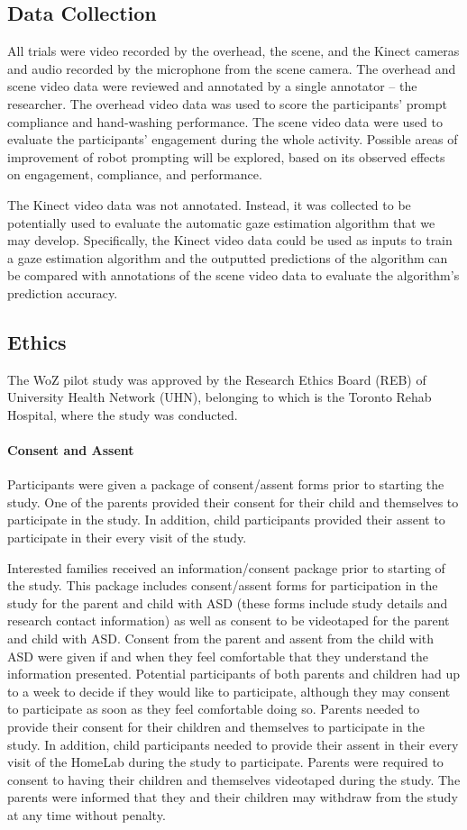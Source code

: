 \documentclass{ut-thesis}
\begin{document}
\subsection{Data Collection}
All trials were video recorded by the overhead, the scene, and the Kinect cameras and audio recorded by the microphone from the scene camera.  The overhead and scene video data were reviewed and annotated by a single annotator -- the researcher. The overhead video data was used to score the participants' prompt compliance and hand-washing performance. The scene video data were used to evaluate the participants' engagement during the whole activity. Possible areas of improvement of robot prompting will be explored, based on its observed effects on engagement, compliance, and performance.

The Kinect video data was not annotated. Instead, it was collected to be potentially used to evaluate the automatic gaze estimation algorithm that we may develop. Specifically, the Kinect video data could be used as inputs to train a gaze estimation algorithm and the outputted predictions of the algorithm can be compared with annotations of the scene video data to evaluate the algorithm's prediction accuracy.


\subsection{Ethics}
The WoZ pilot study was approved by the Research Ethics Board (REB) of University Health Network (UHN), belonging to which is the Toronto Rehab Hospital, where the study was conducted.

\paragraph{Consent and Assent}
Participants were given a package of consent/assent forms prior to starting the study. One of the parents provided their consent for their child and themselves to participate in the study. In addition, child participants provided their assent to participate in their every visit of the study. 

Interested families received an information/consent package prior to starting of the study. This package includes consent/assent forms for participation in the study for the parent and child with ASD (these forms include study details and research contact information) as well as consent to be videotaped for the parent and child with ASD. Consent from the parent and assent from the child with ASD were given if and when they feel comfortable that they understand the information presented. Potential participants of both parents and children had up to a week to decide if they would like to participate, although they may consent to participate as soon as they feel comfortable doing so. Parents needed to provide their consent for their children and themselves to participate in the study. In addition, child participants needed to provide their assent in their every visit of the HomeLab during the study to participate. Parents were required to consent to having their children and themselves videotaped during the study. The parents were informed that they and their children may withdraw from the study at any time without penalty.
\end{document}
